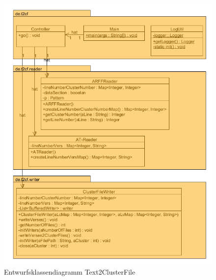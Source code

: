 \begin{figure}[htp]
\centering
\includegraphics[width=1\textwidth]{Ingo/Bilder/EntwurfsklassendiagrammText2ClusterFile.png}
\caption{Entwurfsklassendiagramm Text2ClusterFile}
\label{fig:EntwurfsklassendiagrammText2ClusterFile}
\end{figure}